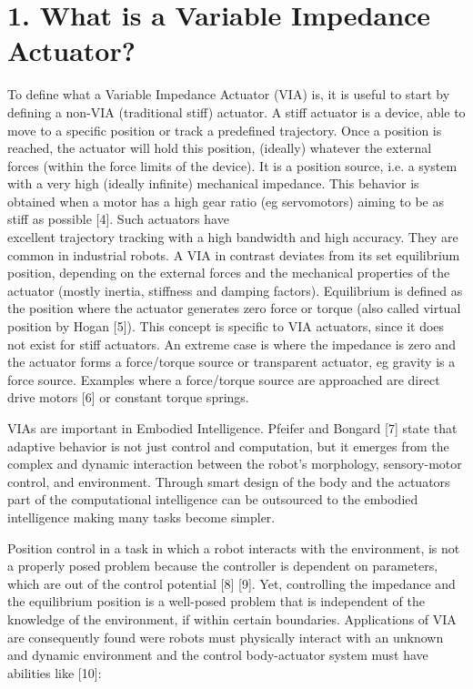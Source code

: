 \documentclass[10pt]{article}
\begin{document}
\section*{1. What is a Variable Impedance Actuator?}
To define what a Variable Impedance Actuator (VIA) is, it is useful to start by defining a non-VIA (traditional stiff) actuator. A stiff actuator is a device, able to move to a specific position or track a predefined trajectory. Once a position is reached, the actuator will hold this position, (ideally) whatever the external forces (within the force limits of the device). It is a position source, i.e. a system with a very high (ideally infinite) mechanical impedance. This behavior is obtained when a motor has a high gear ratio (eg servomotors) aiming to be as stiff as possible [4]. Such actuators have\\[0pt]
excellent trajectory tracking with a high bandwidth and high accuracy. They are common in industrial robots. A VIA in contrast deviates from its set equilibrium position, depending on the external forces and the mechanical properties of the actuator (mostly inertia, stiffness and damping factors). Equilibrium is defined as the position where the actuator generates zero force or torque (also called virtual position by Hogan [5]). This concept is specific to VIA actuators, since it does not exist for stiff actuators. An extreme case is where the impedance is zero and the actuator forms a force/torque source or transparent actuator, eg gravity is a force source. Examples where a force/torque source are approached are direct drive motors [6] or constant torque springs.

VIAs are important in Embodied Intelligence. Pfeifer and Bongard [7] state that adaptive behavior is not just control and computation, but it emerges from the complex and dynamic interaction between the robot's morphology, sensory-motor control, and environment. Through smart design of the body and the actuators part of the computational intelligence can be outsourced to the embodied intelligence making many tasks become simpler.

Position control in a task in which a robot interacts with the environment, is not a properly posed problem because the controller is dependent on parameters, which are out of the control potential [8] [9]. Yet, controlling the impedance and the equilibrium position is a well-posed problem that is independent of the knowledge of the environment, if within certain boundaries. Applications of VIA are consequently found were robots must physically interact with an unknown and dynamic environment and the control body-actuator system must have abilities like [10]:
\end{document}
